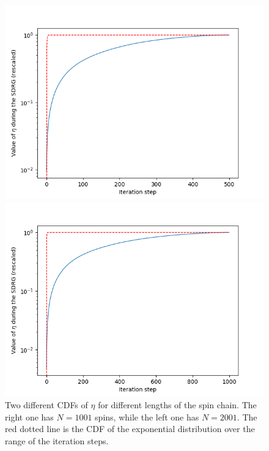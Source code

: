 \documentclass[../numerical,../../main.tex]{subfiles}
\begin{document}
\begin{figure}[H]
\centering
    \begin{minipage}[]{.49\textwidth}
    \includegraphics[scale=0.4]{Chapter5/Figures/Distribution/eta1k.png}
    \end{minipage}
    \begin{minipage}[]{.49\textwidth}
    \includegraphics[scale=0.4]{Chapter5/Figures/Distribution/eta2k.png}
    \end{minipage}
    \caption{Two different CDFs of $\eta$ for different lengths of the spin chain. The right one has $N=1001$ spins, while the left one has $N=2001$. The red dotted line is the CDF of the exponential distribution over the range of the iteration steps.}
    \label{fig:cdf}
\end{figure}
\end{document}
